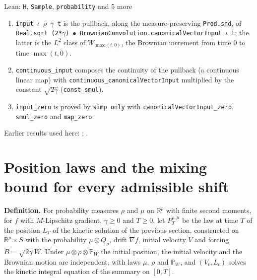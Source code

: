 \documentclass[11pt,a4paper]{article}
\begin{document}
\begin{leanbox}{Lean: \texttt{H}, \texttt{Sample}, \texttt{probability} and 5 more}
\begin{enumerate}
\item \texttt{input \ensuremath{\iota} \ensuremath{\rho} \ensuremath{\gamma} t} is the pullback, along the measure-preserving \texttt{Prod.\allowbreak{}snd}, of \texttt{Real.\allowbreak{}sqrt (2*\ensuremath{\gamma}) \ensuremath{\bullet} Brownian\allowbreak{}Convolution.\allowbreak{}canonical\allowbreak{}Vector\allowbreak{}Input \ensuremath{\iota} t}; the latter is the \(L^2\) class of \(W_{\max(t,0)}\), the Brownian increment from time \(0\) to time \(\max(t,0)\).

\item \texttt{continuous\_\allowbreak{}input} composes the continuity of the pullback (a continuous linear map) with \texttt{continuous\_\allowbreak{}canonical\allowbreak{}Vector\allowbreak{}Input} multiplied by the constant \(\sqrt{2\gamma}\) (\texttt{const\_\allowbreak{}smul}).

\item \texttt{input\_\allowbreak{}zero} is proved by \texttt{simp only} with \texttt{canonical\allowbreak{}Vector\allowbreak{}Input\_\allowbreak{}zero}, \texttt{smul\_\allowbreak{}zero} and \texttt{map\_\allowbreak{}zero}.

\end{enumerate}
\end{leanbox}


Earlier results used here: \cite[Section~3.8.16]{LangevinLean2026ULASC}; \cite[Section~3.8.17]{LangevinLean2026ULASC}.

\section{\texorpdfstring{Position laws and the mixing bound for every admissible shift}{Position laws and the mixing bound for every admissible shift}}


\textbf{Definition.} For probability measures \(\rho\) and \(\mu\) on \(\mathbb R^p\) with finite second moments, for \(f\) with \(M\)-Lipschitz gradient, \(\gamma\ge0\) and \(T\ge0\), let \(P^{\rho,\mu}_T\) be the law at time \(T\) of the position \(L_T\) of the kinetic solution of the previous section, constructed on \(\mathbb R^p\times S\) with the probability \(\mu\otimes Q_\rho\), drift \(\nabla f\), initial velocity \(V\) and forcing \(B=\sqrt{2\gamma}\,W\). Under \(\mu\otimes\rho\otimes\mathbb P_W\) the initial position, the initial velocity and the Brownian motion are independent, with laws \(\mu\), \(\rho\) and \(\mathbb P_W\), and \((V_t,L_t)\) solves the kinetic integral equation of the summary on \([0,T]\).
\end{document}
